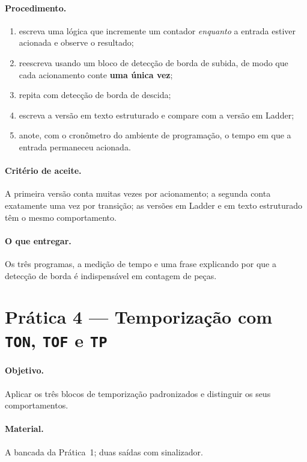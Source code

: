 \paragraph{Procedimento.}
\begin{enumerate}
  \item escreva uma lógica que incremente um contador \emph{enquanto} a entrada estiver acionada e
        observe o resultado;
  \item reescreva usando um bloco de detecção de borda de subida, de modo que cada acionamento conte
        \textbf{uma única vez};
  \item repita com detecção de borda de descida;
  \item escreva a versão em texto estruturado e compare com a versão em Ladder;
  \item anote, com o cronômetro do ambiente de programação, o tempo em que a entrada permaneceu
        acionada.
\end{enumerate}

\paragraph{Critério de aceite.} A primeira versão conta muitas vezes por acionamento; a segunda conta
exatamente uma vez por transição; as versões em Ladder e em texto estruturado têm o mesmo
comportamento.

\paragraph{O que entregar.} Os três programas, a medição de tempo e uma frase explicando por que a
detecção de borda é indispensável em contagem de peças.

\section{Prática 4 --- Temporização com \texttt{TON}, \texttt{TOF} e \texttt{TP}}

\paragraph{Objetivo.} Aplicar os três blocos de temporização padronizados e distinguir os seus
comportamentos.

\paragraph{Material.} A bancada da Prática~1; duas saídas com sinalizador.

